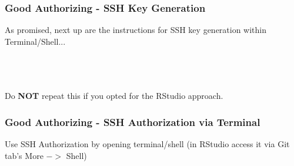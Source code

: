 \documentclass{beamer}\usepackage[]{graphicx}\usepackage[]{color}
\begin{document}
\begin{frame}[fragile]
\frametitle{Good Authorizing - SSH Key Generation}

As promised, next up are the instructions for SSH key generation within Terminal/Shell...
\\$ $\\$ $\\$ $

\Large
\centering
Do \textbf{NOT} repeat this if you opted for the RStudio approach.

\end{frame}

\begin{frame}[fragile]
\frametitle{Good Authorizing - SSH Authorization via Terminal}

Use SSH Authorization by opening terminal/shell (in RStudio access it via Git tab's More $->$ Shell)


\end{frame}
\end{document}

